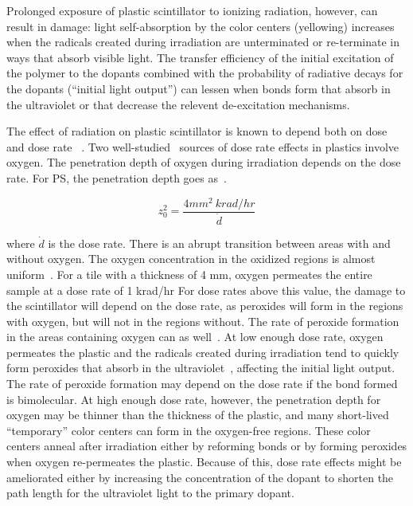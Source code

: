 \documentclass[review]{elsarticle}
\begin{document}
Prolonged exposure of plastic scintillator to
ionizing radiation, however, can result in damage:
light self-absorption by the color centers (yellowing) increases when the radicals created during irradiation are unterminated or re-terminate in ways that absorb visible light.
The transfer efficiency of the initial excitation of the polymer to the
dopants combined with the probability of radiative decays for the dopants (``initial light output'') can lessen
when bonds form that absorb in the ultraviolet or that decrease the relevent de-excitation mechanisms.

The effect of radiation on plastic scintillator is known to depend
both on dose and dose rate ~\cite{sauli,34504,Wick1991472,289295,173180,173178,Giokaris1993315,gillen,1748-0221-11-10-T10004}.  
Two well-studied~\cite{clough1,bolland1,bolland2,bateman,cunliffe,Wick1991472,Biagtan1996125}
sources of dose rate effects in plastics
involve oxygen.   The penetration depth of oxygen
during irradiation depends on the dose rate.
For PS, the penetration depth goes as~\cite{Wick1991472,cloughPS}.
\begin{linenomath}
\begin{equation}
z_0^2=\frac{4 mm^2~ krad/hr}{\dot{d}}
\label{eqn:z0}
\end{equation}
\end{linenomath}
where $\dot{d}$ is the dose rate.
There is an abrupt transition between areas with and without oxygen.  The
oxygen  concentration
in the oxidized regions is almost uniform~\cite{cloughPS}.
For a tile with a thickness of 4 mm, oxygen permeates the entire sample at
a dose rate of 1 krad/hr
For dose rates above this value, the damage to the scintillator
will depend on the dose rate, as peroxides will form in the regions
with oxygen, but will not in the regions without.
The rate of peroxide
formation in the areas containing oxygen can as well~\cite{clough1}.
At low enough dose rate, oxygen permeates the plastic 
and the radicals created during irradiation tend to quickly
form peroxides that absorb in the ultraviolet~\cite{clough1}, 
affecting the initial light output.  
The rate of peroxide formation may depend on the dose rate if the bond formed is bimolecular.
At high enough dose rate, however, the penetration depth for oxygen may
be thinner than the thickness of the plastic, and many short-lived ``temporary'' color centers can form in the oxygen-free regions.  
These color centers anneal after irradiation either by reforming bonds or by forming peroxides when oxygen re-permeates the plastic.
Because of this, dose rate effects might be ameliorated either by increasing the concentration of the dopant to shorten the path length for the ultraviolet light to the primary dopant.
\end{document}
